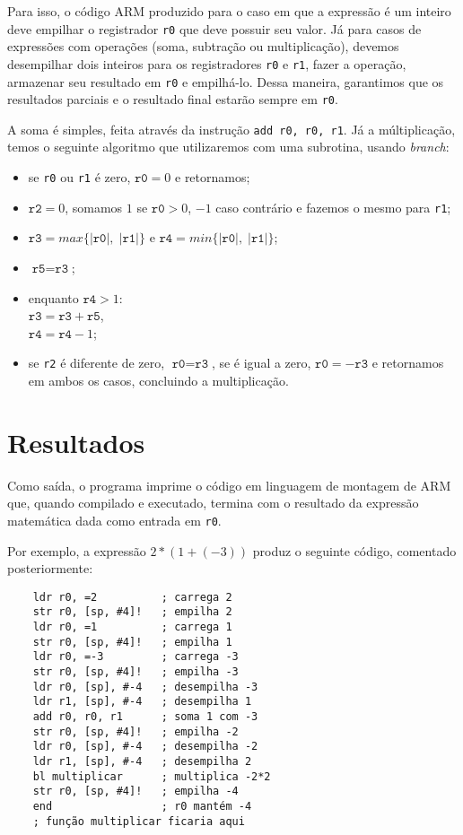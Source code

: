 \documentclass[brazilian,a4paper,twocolumn]{article}
\begin{document}
    Para isso, o código ARM produzido para o caso em que a expressão é um inteiro deve empilhar o registrador \texttt{r0} que deve possuir seu valor. Já para casos de expressões com operações (soma, subtração ou multiplicação), devemos desempilhar dois inteiros para os registradores \texttt{r0} e \texttt{r1}, fazer a operação, armazenar seu resultado em \texttt{r0} e empilhá-lo. Dessa maneira, garantimos que os resultados parciais e o resultado final estarão sempre em \texttt{r0}.

    A soma é simples, feita através da instrução \texttt{add r0, r0, r1}. Já a múltiplicação, temos o seguinte algoritmo que utilizaremos com uma subrotina, usando \textit{branch}:
    \begin{itemize}
        \item se \texttt{r0} ou \texttt{r1} é zero, $ \texttt{r0} = 0 $ e retornamos;
        \item $ \texttt{r2} = 0 $, somamos $1$ se $ \texttt{r0} > 0$, $-1$ caso contrário e fazemos o mesmo para \texttt{r1};
        \item $ \texttt{r3} = max\{ |\texttt{r0}| , \; |\texttt{r1}| \} $ e $ \texttt{r4} = min\{ |\texttt{r0}| , \; |\texttt{r1}| \} $;
        \item $ \texttt{r5} = \texttt{r3} $;
        \item enquanto $ \texttt{r4} > 1 $:\\
            $ \texttt{r3} = \texttt{r3} + \texttt{r5} $,\\
            $ \texttt{r4} = \texttt{r4} - 1 $;
        \item se \texttt{r2} é diferente de zero, $ \texttt{r0} = \texttt{r3} $, se é igual a zero, $ \texttt{r0} =  - \texttt{r3} $ e retornamos em ambos os casos, concluindo a multiplicação.
    \end{itemize}

\section{Resultados}

    Como saída, o programa imprime o código em linguagem de montagem de ARM que, quando compilado e executado, termina com o resultado da expressão matemática dada como entrada em \texttt{r0}.

    Por exemplo, a expressão $ 2 * (1 + (-3)) $ produz o seguinte código, comentado posteriormente:

\begin{verbatim}
    ldr r0, =2          ; carrega 2
    str r0, [sp, #4]!   ; empilha 2
    ldr r0, =1          ; carrega 1
    str r0, [sp, #4]!   ; empilha 1
    ldr r0, =-3         ; carrega -3
    str r0, [sp, #4]!   ; empilha -3
    ldr r0, [sp], #-4   ; desempilha -3
    ldr r1, [sp], #-4   ; desempilha 1
    add r0, r0, r1      ; soma 1 com -3
    str r0, [sp, #4]!   ; empilha -2
    ldr r0, [sp], #-4   ; desempilha -2
    ldr r1, [sp], #-4   ; desempilha 2
    bl multiplicar      ; multiplica -2*2
    str r0, [sp, #4]!   ; empilha -4
    end                 ; r0 mantém -4
    ; função multiplicar ficaria aqui
\end{verbatim}
\end{document}
